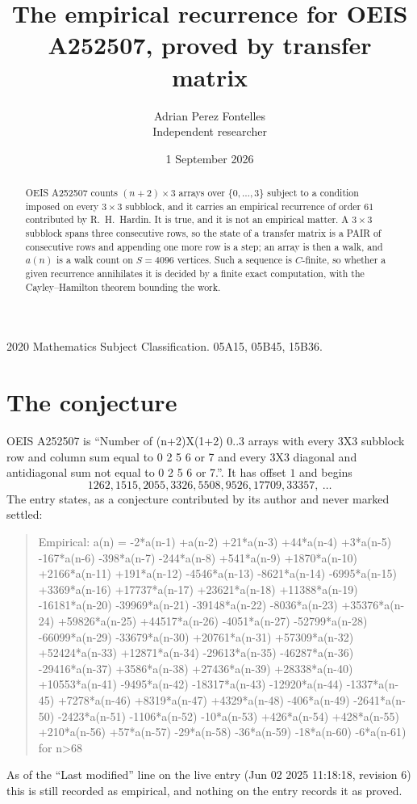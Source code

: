 \documentclass[11pt,a4paper]{article}
\title{The empirical recurrence for OEIS A252507, proved by transfer matrix}
\author{Adrian Perez Fontelles\\ \small Independent researcher}
\date{1 September 2026}
\theoremstyle{plain}
\theoremstyle{definition}
\begin{document}
\maketitle

\begin{abstract}
OEIS A252507 counts $(n+2)\times3$ arrays over $\{0,\dots,3\}$ subject to a condition imposed on
every $3\times3$ subblock, and it carries an empirical recurrence of order $61$
contributed by R.~H.~Hardin. It is true, and it is not an empirical matter. A $3\times3$
subblock spans three consecutive rows, so the state of a transfer matrix is a PAIR of
consecutive rows and appending one more row is a step; an array is then a walk, and
$a(n)$ is a walk count on $S=4096$ vertices. Such a sequence is $C$-finite, so whether a given
recurrence annihilates it is decided by a finite exact computation, with the Cayley--Hamilton
theorem bounding the work.
\end{abstract}

\noindent\small 2020 Mathematics Subject Classification. 05A15, 05B45, 15B36.\normalsize

\section{The conjecture}

OEIS A252507 is ``Number of (n+2)X(1+2) 0..3 arrays with every 3X3 subblock row and column sum equal to 0 2 5 6 or 7 and every 3X3 diagonal and antidiagonal sum not equal to 0 2 5 6 or 7.''. It has offset $1$ and begins
\[
1262, 1515, 2055, 3326, 5508, 9526, 17709, 33357,\ \dots
\]
The entry states, as a conjecture contributed by its author and never marked settled:
\begin{quote}
Empirical: a(n) = -2*a(n-1) +a(n-2) +21*a(n-3) +44*a(n-4) +3*a(n-5) -167*a(n-6) -398*a(n-7) -244*a(n-8) +541*a(n-9) +1870*a(n-10) +2166*a(n-11) +191*a(n-12) -4546*a(n-13) -8621*a(n-14) -6995*a(n-15) +3369*a(n-16) +17737*a(n-17) +23621*a(n-18) +11388*a(n-19) -16181*a(n-20) -39969*a(n-21) -39148*a(n-22) -8036*a(n-23) +35376*a(n-24) +59826*a(n-25) +44517*a(n-26) -4051*a(n-27) -52799*a(n-28) -66099*a(n-29) -33679*a(n-30) +20761*a(n-31) +57309*a(n-32) +52424*a(n-33) +12871*a(n-34) -29613*a(n-35) -46287*a(n-36) -29416*a(n-37) +3586*a(n-38) +27436*a(n-39) +28338*a(n-40) +10553*a(n-41) -9495*a(n-42) -18317*a(n-43) -12920*a(n-44) -1337*a(n-45) +7278*a(n-46) +8319*a(n-47) +4329*a(n-48) -406*a(n-49) -2641*a(n-50) -2423*a(n-51) -1106*a(n-52) -10*a(n-53) +426*a(n-54) +428*a(n-55) +210*a(n-56) +57*a(n-57) -29*a(n-58) -36*a(n-59) -18*a(n-60) -6*a(n-61) for n>68
\end{quote}
As of the ``Last modified'' line on the live entry (Jun 02 2025 11:18:18, revision 6) this is still
recorded as empirical, and nothing on the entry records it as proved.
\end{document}
